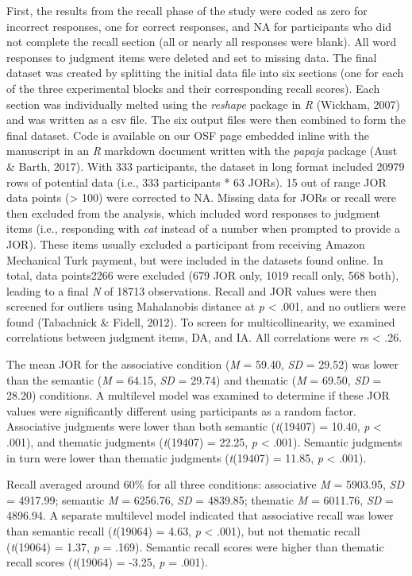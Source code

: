\documentclass[english,,man]{apa6}
\begin{document}
First, the results from the recall phase of the study were coded as zero for incorrect responses, one for correct responses, and NA for participants who did not complete the recall section (all or nearly all responses were blank). All word responses to judgment items were deleted and set to missing data. The final dataset was created by splitting the initial data file into six sections (one for each of the three experimental blocks and their corresponding recall scores). Each section was individually melted using the \emph{reshape} package in \emph{R} (Wickham, 2007) and was written as a csv file. The six output files were then combined to form the final dataset. Code is available on our OSF page embedded inline with the manuscript in an \emph{R} markdown document written with the \emph{papaja} package (Aust \& Barth, 2017). With 333 participants, the dataset in long format included 20979 rows of potential data (i.e., 333 participants * 63 JORs). 15 out of range JOR data points (\textgreater{} 100) were corrected to NA. Missing data for JORs or recall were then excluded from the analysis, which included word responses to judgment items (i.e., responding with \emph{cat} instead of a number when prompted to provide a JOR). These items usually excluded a participant from receiving Amazon Mechanical Turk payment, but were included in the datasets found online. In total, data points2266 were excluded (679 JOR only, 1019 recall only, 568 both), leading to a final \emph{N} of 18713 observations. Recall and JOR values were then screened for outliers using Mahalanobis distance at \emph{p} \textless{} .001, and no outliers were found (Tabachnick \& Fidell, 2012). To screen for multicollinearity, we examined correlations between judgment items, DA, and IA. All correlations were \emph{r}s \textless{} .26.

The mean JOR for the associative condition (\emph{M} = 59.40, \emph{SD} = 29.52) was lower than the semantic (\emph{M} = 64.15, \emph{SD} = 29.74) and thematic (\emph{M} = 69.50, \emph{SD} = 28.20) conditions. A multilevel model was examined to determine if these JOR values were significantly different using participants as a random factor. Associative judgments were lower than both semantic (\emph{t}(19407) = 10.40, \emph{p} \textless{} .001), and thematic judgments (\emph{t}(19407) = 22.25, \emph{p} \textless{} .001). Semantic judgments in turn were lower than thematic judgments (\emph{t}(19407) = 11.85, \emph{p} \textless{} .001).

Recall averaged around 60\% for all three conditions: associative \emph{M} = 5903.95, \emph{SD} = 4917.99; semantic \emph{M} = 6256.76, \emph{SD} = 4839.85; thematic \emph{M} = 6011.76, \emph{SD} = 4896.94. A separate multilevel model indicated that associative recall was lower than semantic recall (\emph{t}(19064) = 4.63, \emph{p} \textless{} .001), but not thematic recall (\emph{t}(19064) = 1.37, \emph{p} = .169). Semantic recall scores were higher than thematic recall scores (\emph{t}(19064) = -3.25, \emph{p} = .001).
\end{document}
